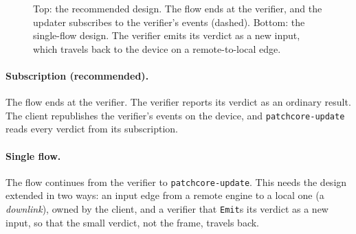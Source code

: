 \documentclass[11pt]{article}
\newcommand{\code}[1]{\texttt{#1}}
\begin{document}
\begin{figure}[h]
\centering
{}

\vspace{0.4cm}
\caption{Top: the recommended design. The flow ends at the verifier, and the
updater subscribes to the verifier's events (dashed). Bottom: the single-flow
design. The verifier emits its verdict as a new input, which travels back to
the device on a remote-to-local edge.}
\label{fig:designs}
\end{figure}

\paragraph{Subscription (recommended).} The flow ends at the verifier. The
verifier reports its verdict as an ordinary result. The client republishes the
verifier's events on the device, and \code{patchcore-update} reads every
verdict from its subscription.

\paragraph{Single flow.} The flow continues from the verifier to
\code{patchcore-update}. This needs the design extended in two ways: an input
edge from a remote engine to a local one (a \emph{downlink}), owned by the
client, and a verifier that \code{Emit}s its verdict as a new input, so that
the small verdict, not the frame, travels back.
\end{document}
